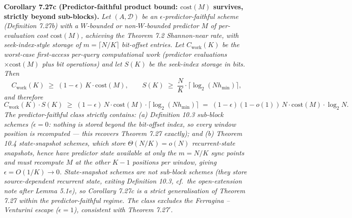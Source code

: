 \documentclass[
]{article}
\begin{document}
\textbf{Corollary 7.27c (Predictor-faithful product bound: $\mathrm{cost}
(M)$ survives, strictly beyond sub-blocks).} \emph{Let $(A,
\mathcal{D})$ be an $\epsilon$-predictor-faithful scheme (Definition
7.27b) with a $W$-bounded or non-$W$-bounded predictor $M$ of
per-evaluation cost $\mathrm{cost}(M)$, achieving the Theorem 7.2
Shannon-near rate, with seek-index-style storage of $m = \lceil N/K
\rceil$ bit-offset entries. Let $C_{\mathrm{work}}(K)$ be the worst-case
first-access per-query \emph{computational work} (predictor evaluations
$\times \mathrm{cost}(M)$ plus bit operations) and let $S(K)$ be the
seek-index storage in bits. Then}
\[
  C_{\mathrm{work}}(K) \;\geq\; (1 - \epsilon)\, K \cdot \mathrm{cost}(M),
  \qquad
  S(K) \;\geq\; \frac{N}{K} \cdot \bigl\lceil \log_2(N h_{\min})
  \bigr\rceil,
\]
\emph{and therefore}
\[
  C_{\mathrm{work}}(K) \cdot S(K) \;\geq\; (1 - \epsilon)\, N \cdot
  \mathrm{cost}(M) \cdot \bigl\lceil \log_2(N h_{\min}) \bigr\rceil
  \;=\; (1 - \epsilon)(1 - o(1))\, N \cdot \mathrm{cost}(M) \cdot \log_2 N.
\]
\emph{The predictor-faithful class strictly contains: (a) Definition
10.3 sub-block schemes ($\epsilon = 0$: nothing is stored beyond the
bit-offset index, so every window position is recomputed --- this
recovers Theorem 7.27 exactly); and (b) Theorem 10.4 state-snapshot
schemes, which store $\Theta(N/K) = o(N)$ recurrent-state snapshots,
hence have predictor state available at only the $m = N/K$ sync points
and must recompute $M$ at the other $K-1$ positions per window, giving
$\epsilon = O(1/K) \to 0$. State-snapshot schemes are \emph{not}
sub-block schemes (they store source-dependent recurrent state, exiting
Definition 10.3, cf.\ the open-extension note after Lemma 5.1e), so
Corollary 7.27c is a strict generalisation of Theorem 7.27 within the
predictor-faithful regime. The class \emph{excludes} the Ferragina
--Venturini escape ($\epsilon = 1$), consistent with Theorem 7.27$'$.}
\end{document}
